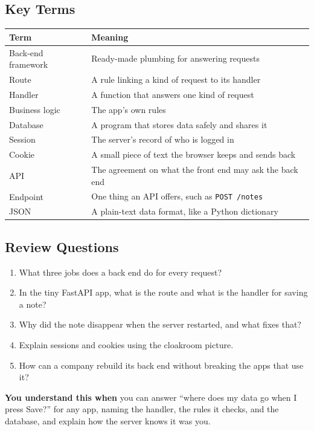 
\subsection*{Key Terms}\label{webapp-03:key-terms}

{\def\LTcaptype{none} %
\begin{longtable}[]{@{}
  >{\raggedright\arraybackslash}p{}
  >{\raggedright\arraybackslash}p{}@{}}
\toprule\noalign{}
\begin{minipage}[b]{\linewidth}\raggedright
Term
\end{minipage} & \begin{minipage}[b]{\linewidth}\raggedright
Meaning
\end{minipage} \\
\midrule\noalign{}
\endhead
\bottomrule\noalign{}
\endlastfoot
Back-end framework & Ready-made plumbing for answering requests \\
Route & A rule linking a kind of request to its handler \\
Handler & A function that answers one kind of request \\
Business logic & The app's own rules \\
Database & A program that stores data safely and shares it \\
Session & The server's record of who is logged in \\
Cookie & A small piece of text the browser keeps and sends back \\
API & The agreement on what the front end may ask the back end \\
Endpoint & One thing an API offers, such as \texttt{POST\ /notes} \\
JSON & A plain-text data format, like a Python dictionary \\
\end{longtable}
}

\subsection*{Review Questions}\label{webapp-03:review-questions}

\begin{enumerate}
\def\labelenumi{\arabic{enumi}.}
\tightlist
\item
  What three jobs does a back end do for every request?
\item
  In the tiny FastAPI app, what is the route and what is the handler for saving a note?
\item
  Why did the note disappear when the server restarted, and what fixes that?
\item
  Explain sessions and cookies using the cloakroom picture.
\item
  How can a company rebuild its back end without breaking the apps that use it?
\end{enumerate}

\begin{notebox}

\textbf{You understand this when} you can answer ``where does my data go when I press Save?'' for any app, naming the handler, the rules it checks, and the database, and explain how the server knows it was you.

\end{notebox}
